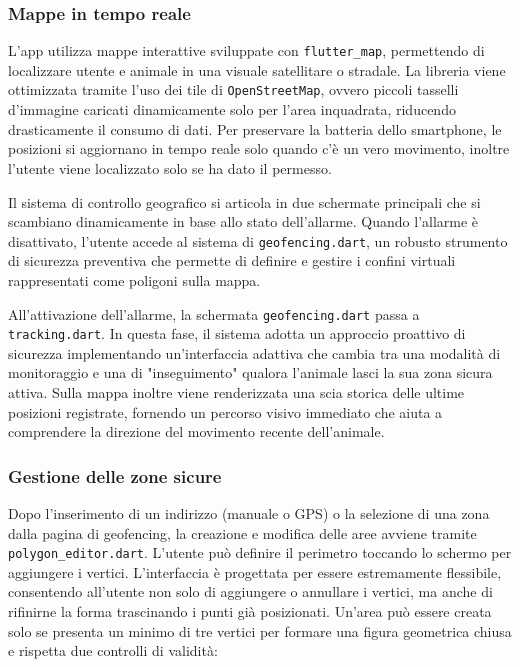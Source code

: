 \documentclass[12pt,a4paper]{article}
\begin{document}
\subsubsection{Mappe in tempo reale}

L’app utilizza mappe interattive sviluppate con \texttt{flutter\_map}, 
permettendo di localizzare utente e animale in una visuale satellitare o stradale. 
La libreria viene ottimizzata tramite l'uso dei tile di \texttt{OpenStreetMap}, 
ovvero piccoli tasselli d'immagine caricati dinamicamente solo per l'area inquadrata, 
riducendo drasticamente il consumo di dati. 
Per preservare la batteria dello smartphone, 
le posizioni si aggiornano in tempo reale solo quando c'è un vero movimento, 
inoltre l'utente viene localizzato solo se ha dato il permesso.

Il sistema di controllo geografico si articola in due schermate principali 
che si scambiano dinamicamente in base allo stato dell'allarme. 
Quando l'allarme è disattivato, l'utente accede al sistema di \texttt{geofencing.dart}, 
un robusto strumento di sicurezza preventiva che permette di definire e gestire
i confini virtuali rappresentati come poligoni sulla mappa. 

All'attivazione dell'allarme, la schermata \texttt{geofencing.dart} passa a \texttt{tracking.dart}. 
In questa fase, il sistema adotta un approccio proattivo di sicurezza 
implementando un'interfaccia adattiva che cambia tra una modalità 
di monitoraggio e una di "inseguimento" qualora l’animale lasci la sua zona sicura attiva. 
Sulla mappa inoltre viene renderizzata una scia storica 
delle ultime posizioni registrate, fornendo un percorso visivo immediato 
che aiuta a comprendere la direzione del movimento recente dell’animale. 

\subsubsection{Gestione delle zone sicure}

Dopo l’inserimento di un indirizzo (manuale o GPS) o 
la selezione di una zona dalla pagina di geofencing,
la creazione e modifica delle aree avviene tramite \texttt{polygon\_editor.dart}.
L’utente può definire il perimetro toccando lo schermo per aggiungere i vertici.
L'interfaccia è progettata per essere estremamente flessibile, 
consentendo all'utente non solo di aggiungere o annullare i vertici, 
ma anche di rifinirne la forma trascinando i punti già posizionati.
Un'area può essere creata solo se presenta un minimo di tre vertici per formare una figura geometrica chiusa 
e rispetta due controlli di validità:
\end{document}
